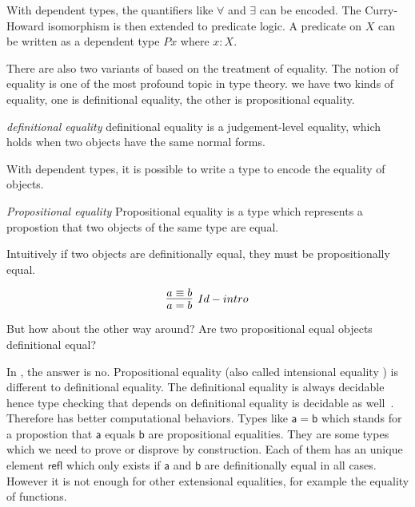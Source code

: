 With dependent types, the quantifiers like $\forall$ and $\exists$ can be encoded.
The Curry-Howard isomorphism is then extended to predicate logic. 
A predicate on $X$ can be written as a dependent type $P x$ where $x : X$. 

There are also two variants of \mltt based on the treatment of equality.
The notion of equality is one of the most profound topic in type theory.
we have two kinds of equality, one is definitional equality, the other is propositional equality.

\begin{definition}
\textit{definitional equality} definitional equality is a judgement-level equality, which holds when two objects have the same normal forms\cite{nor:90}.
\end{definition}



With dependent types, it is possible to write a type to encode the equality of objects.

\begin{definition}
\textit{Propositional equality} Propositional equality is a type which represents a propostion that two objects of the same type are equal.
\end{definition}

Intuitively if two objects are definitionally equal, they must be propositionally equal.

\begin{equation*}
\infer[Id-intro]{a = b}{a \equiv b}
\end{equation*}

But how about the other way around? Are two propositional equal objects definitional equal?


In \itt, the answer is no. Propositional equality (also called intensional equality  \cite{nor:90}) is different to definitional equality. 
The definitional equality is always decidable hence type checking that depends on definitional equality is
decidable as well~\cite{alti:lics99}. Therefore \itt has better computational behaviors.
Types like $\mathsf{a = b}$ which stands for a
propostion that $\mathsf{a}$ equals $\mathsf{b}$ are propositional equalities. They are some types which we need to prove
or disprove by construction. Each of them has an unique element $\mathsf{refl}$ which only exists if $\mathsf{a}$ and $\mathsf{b}$ are
definitionally equal in all cases. However it is not enough for other extensional equalities, for example the equality of functions.


